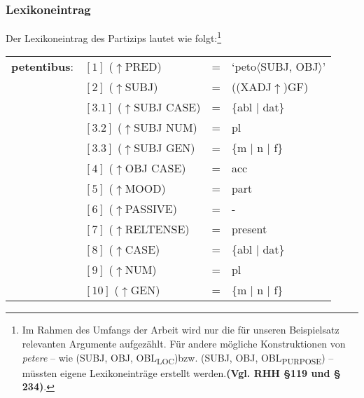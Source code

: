 \documentclass[12pt,a4paper]{article}
\begin{document}
\subsubsection{Lexikoneintrag}
Der Lexikoneintrag des Partizips lautet wie folgt:\footnote{Im Rahmen des Umfangs der Arbeit wird nur die für unseren Beispielsatz relevanten Argumente aufgezählt. Für andere mögliche Konstruktionen von \textit{petere} -- wie (SUBJ, OBJ, OBL\textsubscript{LOC})bzw. (SUBJ, OBJ, OBL\textsubscript{PURPOSE}) -- müssten eigene Lexikoneinträge erstellt werden.\textbf{(Vgl. RHH §119 und § 234)}.}
\begin{singlespace}
\begin{tabular}{ l  l  l  l  } 
\textbf{petentibus}: & $[1]$ \:  ($\uparrow$PRED) & = & `peto$\langle$SUBJ, OBJ$\rangle$' \\
$\qquad$ & $[2]$ \:  ($\uparrow$SUBJ) & = & ((XADJ$\uparrow$)GF)\\
$\qquad$ & $[3.1]$ \:  ($\uparrow$SUBJ CASE) & = & \{abl $\mid$ dat\} \\
$\qquad$ & $[3.2]$ \:  ($\uparrow$SUBJ NUM) & = & pl \\
$\qquad$ & $[3.3]$ \:  ($\uparrow$SUBJ GEN) & = & \{m $\mid$ n $\mid$ f\} \\
$\qquad$ & $[4]$ \:  ($\uparrow$OBJ CASE) & = & acc \\
$\qquad$ & $[5]$ \:  ($\uparrow$MOOD) & = & part\\
$\qquad$ & $[6]$ \:  ($\uparrow$PASSIVE) & = & - \\
$\qquad$ & $[7]$ \:  ($\uparrow$RELTENSE) & = & present \\ 
$\qquad$ & $[8]$ \:  ($\uparrow$CASE) & = & \{abl $\mid$ dat\} \\
$\qquad$ & $[9]$ \:  ($\uparrow$NUM) & = & pl \\
$\qquad$ & $[10]$ \:  ($\uparrow$GEN) & = & \{m $\mid$ n $\mid$ f\} \\
\end{tabular}
\newline
\newline
\end{singlespace}
\end{document}
